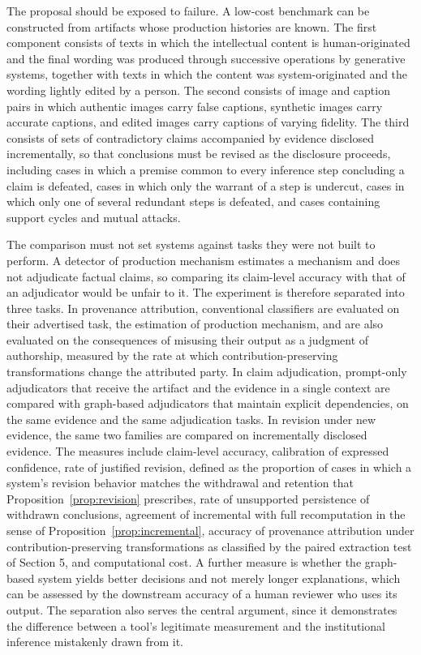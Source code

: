 \documentclass[12pt]{article}
\theoremstyle{definition}
\theoremstyle{remark}
\begin{document}
The proposal should be exposed to failure. A low-cost benchmark can be constructed from artifacts whose production histories are known. The first component consists of texts in which the intellectual content is human-originated and the final wording was produced through successive operations by generative systems, together with texts in which the content was system-originated and the wording lightly edited by a person. The second consists of image and caption pairs in which authentic images carry false captions, synthetic images carry accurate captions, and edited images carry captions of varying fidelity. The third consists of sets of contradictory claims accompanied by evidence disclosed incrementally, so that conclusions must be revised as the disclosure proceeds, including cases in which a premise common to every inference step concluding a claim is defeated, cases in which only the warrant of a step is undercut, cases in which only one of several redundant steps is defeated, and cases containing support cycles and mutual attacks.

The comparison must not set systems against tasks they were not built to perform. A detector of production mechanism estimates a mechanism and does not adjudicate factual claims, so comparing its claim-level accuracy with that of an adjudicator would be unfair to it. The experiment is therefore separated into three tasks. In provenance attribution, conventional classifiers are evaluated on their advertised task, the estimation of production mechanism, and are also evaluated on the consequences of misusing their output as a judgment of authorship, measured by the rate at which contribution-preserving transformations change the attributed party. In claim adjudication, prompt-only adjudicators that receive the artifact and the evidence in a single context are compared with graph-based adjudicators that maintain explicit dependencies, on the same evidence and the same adjudication tasks. In revision under new evidence, the same two families are compared on incrementally disclosed evidence. The measures include claim-level accuracy, calibration of expressed confidence, rate of justified revision, defined as the proportion of cases in which a system's revision behavior matches the withdrawal and retention that Proposition~\ref{prop:revision} prescribes, rate of unsupported persistence of withdrawn conclusions, agreement of incremental with full recomputation in the sense of Proposition~\ref{prop:incremental}, accuracy of provenance attribution under contribution-preserving transformations as classified by the paired extraction test of Section 5, and computational cost. A further measure is whether the graph-based system yields better decisions and not merely longer explanations, which can be assessed by the downstream accuracy of a human reviewer who uses its output. The separation also serves the central argument, since it demonstrates the difference between a tool's legitimate measurement and the institutional inference mistakenly drawn from it.
\end{document}
